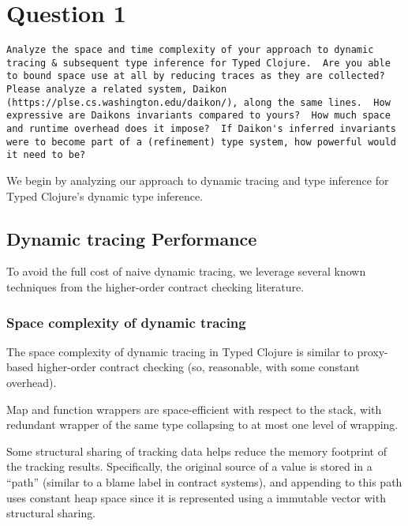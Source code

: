 \section{Question 1}

\begin{verbatim}
Analyze the space and time complexity of your approach to dynamic
tracing & subsequent type inference for Typed Clojure.  Are you able
to bound space use at all by reducing traces as they are collected?
Please analyze a related system, Daikon
(https://plse.cs.washington.edu/daikon/), along the same lines.  How
expressive are Daikons invariants compared to yours?  How much space
and runtime overhead does it impose?  If Daikon's inferred invariants
were to become part of a (refinement) type system, how powerful would
it need to be?
\end{verbatim}

We begin by analyzing our approach to dynamic tracing and type inference
for Typed Clojure's dynamic type inference.

\subsection{Dynamic tracing Performance}

To avoid the full cost of naive dynamic tracing, we leverage several
known techniques from the higher-order contract checking literature.

\subsubsection{Space complexity of dynamic tracing}

The space complexity of dynamic tracing in Typed Clojure is similar
to proxy-based higher-order contract checking (so, reasonable, with
some constant overhead).

Map and function wrappers are space-efficient with respect to the stack, with
redundant wrapper of the same type collapsing to at most one level of wrapping.

Some structural sharing of tracking data helps reduce the memory footprint
of the tracking results. Specifically, the original source of a value
is stored in a ``path'' (similar to a blame label in contract systems),
and appending to this path uses constant heap space since it is represented
using a immutable vector with structural sharing.


